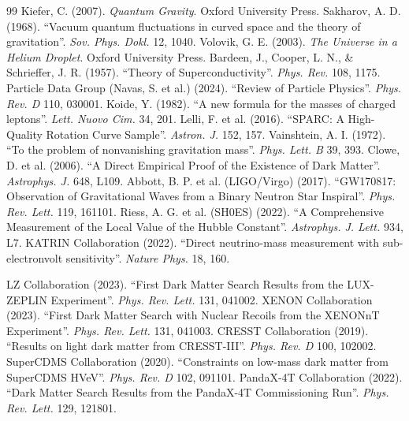 \documentclass[a4paper,12pt]{article}
\begin{document}
\begin{thebibliography}{99}
 Kiefer, C. (2007). \textit{Quantum Gravity}. Oxford University Press.
 Sakharov, A. D. (1968). ``Vacuum quantum fluctuations in curved space and the theory of gravitation''. \textit{Sov. Phys. Dokl.} 12, 1040.
 Volovik, G. E. (2003). \textit{The Universe in a Helium Droplet}. Oxford University Press.
 Bardeen, J., Cooper, L. N., \& Schrieffer, J. R. (1957). ``Theory of Superconductivity''. \textit{Phys. Rev.} 108, 1175.
 Particle Data Group (Navas, S. et al.) (2024). ``Review of Particle Physics''. \textit{Phys. Rev. D} 110, 030001.
 Koide, Y. (1982). ``A new formula for the masses of charged leptons''. \textit{Lett. Nuovo Cim.} 34, 201.
 Lelli, F. et al. (2016). ``SPARC: A High-Quality Rotation Curve Sample''. \textit{Astron. J.} 152, 157.
 Vainshtein, A. I. (1972). ``To the problem of nonvanishing gravitation mass''. \textit{Phys. Lett. B} 39, 393.
 Clowe, D. et al. (2006). ``A Direct Empirical Proof of the Existence of Dark Matter''. \textit{Astrophys. J.} 648, L109.
 Abbott, B. P. et al. (LIGO/Virgo) (2017). ``GW170817: Observation of Gravitational Waves from a Binary Neutron Star Inspiral''. \textit{Phys. Rev. Lett.} 119, 161101.
 Riess, A. G. et al. (SH0ES) (2022). ``A Comprehensive Measurement of the Local Value of the Hubble Constant''. \textit{Astrophys. J. Lett.} 934, L7.
 KATRIN Collaboration (2022). ``Direct neutrino-mass measurement with sub-electronvolt sensitivity''. \textit{Nature Phys.} 18, 160.


 LZ Collaboration (2023). ``First Dark Matter Search Results from the LUX-ZEPLIN Experiment''. \textit{Phys. Rev. Lett.} 131, 041002.
 XENON Collaboration (2023). ``First Dark Matter Search with Nuclear Recoils from the XENONnT Experiment''. \textit{Phys. Rev. Lett.} 131, 041003.
 CRESST Collaboration (2019). ``Results on light dark matter from CRESST-III''. \textit{Phys. Rev. D} 100, 102002.
 SuperCDMS Collaboration (2020). ``Constraints on low-mass dark matter from SuperCDMS HVeV''. \textit{Phys. Rev. D} 102, 091101.
 PandaX-4T Collaboration (2022). ``Dark Matter Search Results from the PandaX-4T Commissioning Run''. \textit{Phys. Rev. Lett.} 129, 121801.


\end{thebibliography}
\end{document}
